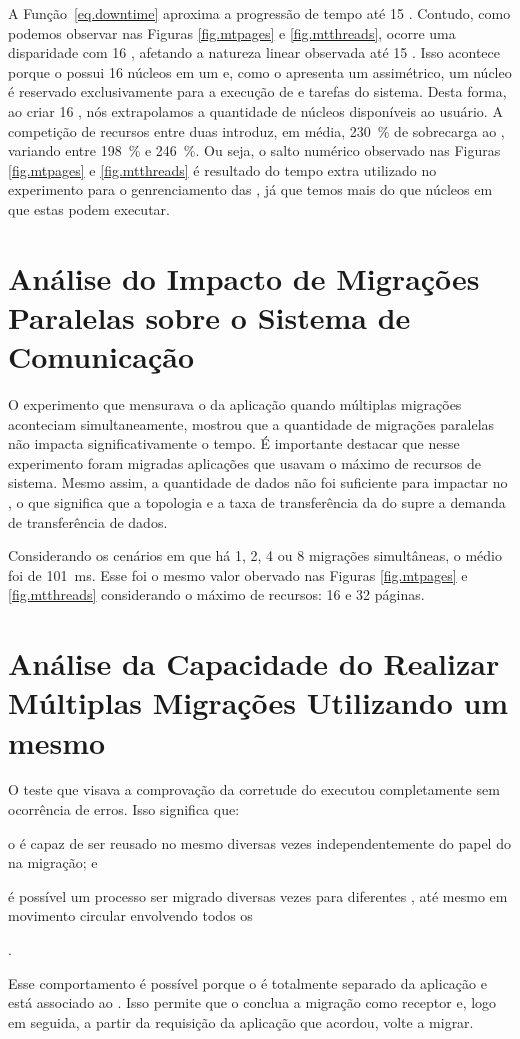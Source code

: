 A Função~\ref{eq.downtime} aproxima a progressão de tempo até 15 \threads. Contudo, como podemos observar nas Figuras \ref{fig.mtpages} e \ref{fig.mtthreads}, ocorre uma disparidade com 16 \threads, afetando a natureza linear observada até 15 \threads. Isso acontece porque o \mppa possui 16 núcleos em um \cluster e, como o \nanvix apresenta um \microkernel assimétrico, um núcleo é reservado exclusivamente para a execução de \threads e tarefas do sistema. Desta forma, ao criar 16 \threads, nós extrapolamos a quantidade de núcleos disponíveis ao usuário. A competição de recursos entre duas \threads introduz, em média, 230~\% de sobrecarga ao \downtime, variando entre 198~\% e 246~\%. Ou seja, o salto numérico observado nas Figuras \ref{fig.mtpages} e \ref{fig.mtthreads} é resultado do tempo extra utilizado no experimento para o genrenciamento das \threads, já que temos mais \threads do que núcleos em que estas podem executar.

\section{Análise do Impacto de Migrações Paralelas sobre o Sistema de Comunicação}

O experimento que mensurava o \downtime da aplicação quando múltiplas migrações aconteciam simultaneamente, mostrou que a quantidade de migrações paralelas não impacta significativamente o tempo. É importante destacar que nesse experimento foram migradas aplicações que usavam o máximo de recursos de sistema. Mesmo assim, a quantidade de dados não foi suficiente para impactar no \downtime, o que significa que a topologia e a taxa de transferência da \noc do \mppa supre a demanda de transferência de dados.

Considerando os cenários em que há 1, 2, 4 ou 8 migrações simultâneas, o \downtime médio foi de 101~ms. Esse foi o mesmo valor obervado nas Figuras \ref{fig.mtpages} e \ref{fig.mtthreads} considerando o máximo de recursos: 16 \threads e 32 páginas.

\section{Análise da Capacidade do \daemon Realizar Múltiplas Migrações Utilizando um mesmo \cluster}

O teste que visava a comprovação da corretude do \daemon executou completamente sem ocorrência de erros. Isso significa que:
\begin{inlinelist}
    \item o \daemon é capaz de ser reusado no mesmo \cluster diversas vezes independentemente do papel do \cluster na migração; e
    \item é possível um processo ser migrado diversas vezes para diferentes \clusters, até mesmo em movimento circular envolvendo todos os \clusters
\end{inlinelist}.

Esse comportamento é possível porque o \daemon é totalmente separado da aplicação e está associado ao . Isso permite que o \daemon conclua a migração como receptor e, logo em seguida, a partir da requisição da aplicação que acordou, volte a migrar.